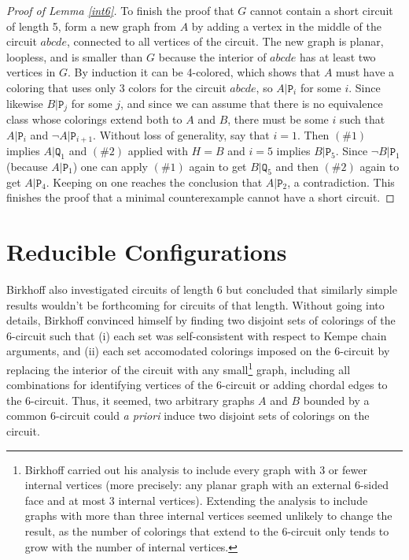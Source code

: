 \documentclass[11pt]{article}
\newcommand{\rA}[1]{\texttt{P}_{{#1}}}
\newcommand{\rB}[1]{\texttt{Q}_{#1}}
\newcommand{\gA}{A}
\newcommand{\gB}{B}
\begin{document}
\begin{proof}[Proof of Lemma \ref{int6}]
To finish the proof that $G$ cannot contain a short circuit of length 5, form a new graph from $\gA$ by adding a vertex in the middle of the circuit $abcde$, connected to all vertices of the circuit. The new graph is planar, loopless, and is smaller than $G$ because the interior of $abcde$ has at least two vertices in $G$. By induction it can be 4-colored, which shows that $\gA$ must have a coloring that uses only 3 colors for the circuit $abcde$, so $\gA|\rA{i}$ for some $i$. Since likewise $\gB|\rA{j}$ for some $j$, and since we can assume that there is no equivalence class whose colorings extend both to $\gA$ and $\gB$, there must be some $i$ such that $\gA|\rA{i}$ and $\neg \gA|\rA{i+1}$. Without loss of generality, say that $i = 1$. Then $(\#1)$ implies $\gA|\rB{1}$ and $(\#2)$ applied with $H = \gB$ and $i = 5$ implies $\gB|\rA{5}$. Since $\neg \gB|\rA{1}$ (because $\gA|\rA{1}$) one can apply $(\#1)$ again to get $\gB|\rB{5}$ and then $(\#2)$ again to get $\gA|\rA{4}$. Keeping on one reaches the conclusion that $\gA|\rA{2}$, a contradiction. This finishes the proof that a minimal counterexample cannot have a short circuit.
\end{proof}

\section{Reducible Configurations}

Birkhoff also investigated circuits of length 6 but concluded that similarly simple results wouldn't be forthcoming for circuits of that length.
Without going into details, Birkhoff convinced himself by finding two disjoint sets of colorings of the 6-circuit such that (i) each set was 
self-consistent with respect to 
Kempe chain arguments, and (ii) each set accomodated colorings imposed on the 6-circuit by replacing the interior of the circuit 
with any small\footnote{Birkhoff carried out his analysis to include every graph with 3 or fewer internal vertices (more precisely: any planar graph with an external 6-sided face and at most 3 internal vertices). Extending the analysis to include graphs with more than three internal vertices seemed unlikely to change the result, as the number of colorings that extend to the 6-circuit only tends to grow with the number of internal vertices.} 
graph, including all combinations for identifying vertices of the 6-circuit or adding chordal edges to the 6-circuit. 
Thus, it seemed, two arbitrary graphs $\gA$ and $\gB$ bounded by a common 6-circuit could \emph{a priori} induce two disjoint sets of colorings on the circuit. 
\end{document}
